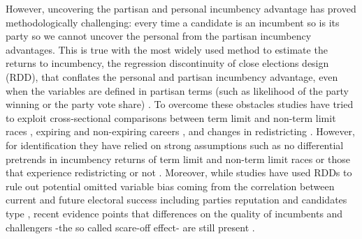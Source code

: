 \documentclass[12pt]{amsart}
\numberwithin{equation}{section}
\theoremstyle{definition}
\theoremstyle{definition}
\theoremstyle{definition}
\begin{document}
However, uncovering the partisan and personal incumbency advantage has proved methodologically challenging: every time a candidate is an incumbent so is its party so we cannot uncover the personal from the partisan incumbency advantages. %
This is true with the most widely used method to estimate the returns to incumbency, the regression discontinuity of close elections design (RDD), that conflates the personal and partisan incumbency advantage, even when the variables are defined in partisan terms (such as likelihood of the party winning or the party vote share) \citep{fowler_hall_2014}. To overcome these obstacles studies have tried to exploit cross-sectional comparisons between term limit and non-term limit races \citep{gelman_king_1990}, expiring and non-expiring careers \citep{fowler_hall_2014}, and changes in redistricting \citep{ansolabehere_snyder_2000, desposato_petrocik_2003, sekhon_titiunik_2012}. However, for identification they have relied on strong assumptions such as no differential pretrends in incumbency returns of term limit and non-term limit races \citep{fowler_hall_2014} or those that experience redistricting or not \citep{ansolabehere_snyder_2004}. %
Moreover,  while studies have used RDDs to rule out potential omitted variable bias coming from the correlation between current and future electoral success including parties reputation and candidates type \citep{klasnja_titiunik_2017}, recent evidence points that differences on the quality of incumbents and challengers -the so called scare-off effect- are still present \citep{eggers_2017}. 
\end{document}
